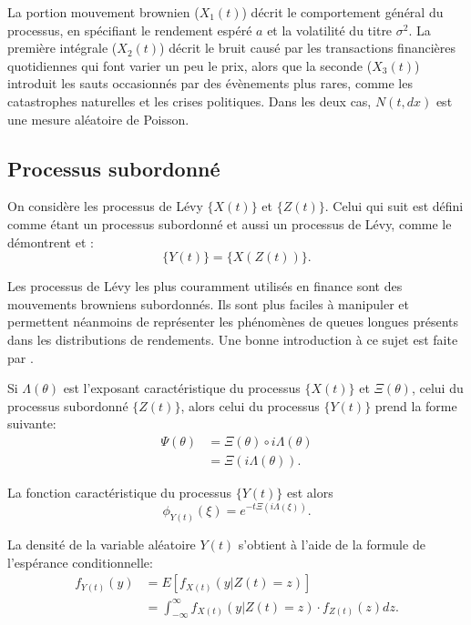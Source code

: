 La portion mouvement brownien ($X_1(t)$) décrit le comportement
général du processus, en spécifiant le rendement espéré $a$ et la
volatilité du titre $\sigma^2$. La première intégrale ($X_2(t)$)
décrit le bruit causé par les transactions financières quotidiennes
qui font varier un peu le prix, alors que la seconde ($X_3(t)$)
introduit les sauts occasionnés par des évènements plus rares, comme
les catastrophes naturelles et les crises politiques. Dans les deux
cas, $N(t,dx)$ est une mesure aléatoire de Poisson.

\subsection{Processus subordonné}
\label{sec:procsubordonne}

On considère les processus de Lévy $\lbrace X(t) \rbrace$ et $\lbrace
Z(t) \rbrace$. Celui qui suit est défini comme étant un processus
subordonné et aussi un processus de Lévy, comme le démontrent
\cite{sato1999levy} et \cite{schoutens2003levy}:
\begin{equation}
  \label{eq:processussubordonne}
  \lbrace Y(t) \rbrace = \lbrace X\left(Z(t)\right) \rbrace.
\end{equation}

Les processus de Lévy les plus couramment utilisés en finance sont des
mouvements browniens subordonnés. Ils sont plus faciles à manipuler et
permettent néanmoins de représenter les phénomènes de queues longues
présents dans les distributions de rendements. Une bonne introduction
à ce sujet est faite par \cite{kyprianou2007introductory}.

Si $\Lambda(\theta)$ est l'exposant caractéristique du processus
$\lbrace X(t)\rbrace$ et $\Xi(\theta)$, celui du processus subordonné
$\lbrace Z(t)\rbrace$, alors celui du processus $\lbrace Y(t)\rbrace$
prend la forme suivante:
\begin{align}
  \label{eq:exposantcaractYt}
  \Psi(\theta) &= \Xi(\theta)\circ i\Lambda(\theta) \nonumber\\
  &= \Xi(i\Lambda(\theta)).
\end{align}

La fonction caractéristique du processus $\lbrace Y(t) \rbrace$ est
alors
\begin{equation}
  \label{eq:fncaractYt}
  \phi_{Y(t)}(\xi) = e^{-t\Xi(i\Lambda(\xi))}.
\end{equation}

La densité de la variable aléatoire $Y(t)$ s'obtient à l'aide de la
formule de l'espérance conditionnelle:
\begin{align}
  f_{Y(t)}(y) &= E\left[ f_{X(t)}(y|Z(t)=z) \right] \nonumber\\
  &= \int_{-\infty}^{\infty} f_{X(t)}(y|Z(t)=z) \cdot f_{Z(t)}(z)
  dz \label{eq:densiteprocessusyt}.
\end{align}

